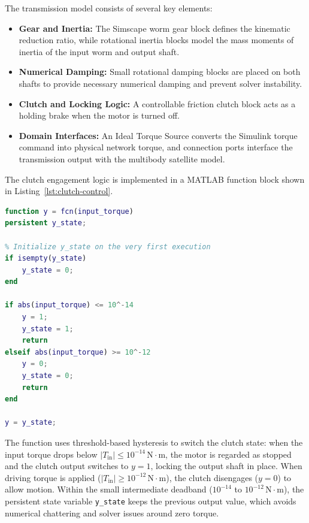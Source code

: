 The transmission model consists of several key elements:
\begin{itemize}
    \item \textbf{Gear and Inertia:} The Simscape worm gear block defines the kinematic reduction ratio, while rotational inertia blocks model the mass moments of inertia of the input worm and output shaft.
    \item \textbf{Numerical Damping:} Small rotational damping blocks are placed on both shafts to provide necessary numerical damping and prevent solver instability.
    \item \textbf{Clutch and Locking Logic:} A controllable friction clutch block acts as a holding brake when the motor is turned off.
    \item \textbf{Domain Interfaces:} An Ideal Torque Source converts the Simulink torque command into physical network torque, and connection ports interface the transmission output with the multibody satellite model.
\end{itemize}

The clutch engagement logic is implemented in a MATLAB function block shown in Listing~\ref{lst:clutch-control}.

\begin{lstlisting}[style=vscodelight, language=Matlab, morekeywords={persistent, isempty}, caption={MATLAB function script governing clutch engagement logic for self-locking simulation.}, label={lst:clutch-control}]
function y = fcn(input_torque)
persistent y_state;

% Initialize y_state on the very first execution
if isempty(y_state)
    y_state = 0; 
end

if abs(input_torque) <= 10^-14
    y = 1;
    y_state = 1;
    return
elseif abs(input_torque) >= 10^-12
    y = 0;
    y_state = 0;
    return
end

y = y_state;
\end{lstlisting}

The function uses threshold-based hysteresis to switch the clutch state: when the input torque drops below $|T_{\text{in}}| \le 10^{-14}\,\text{N}\cdot\text{m}$, the motor is regarded as stopped and the clutch output switches to $y=1$, locking the output shaft in place. When driving torque is applied ($|T_{\text{in}}| \ge 10^{-12}\,\text{N}\cdot\text{m}$), the clutch disengages ($y=0$) to allow motion. Within the small intermediate deadband ($10^{-14}$ to $10^{-12}\,\text{N}\cdot\text{m}$), the persistent state variable \texttt{y\_state} keeps the previous output value, which avoids numerical chattering and solver issues around zero torque.

